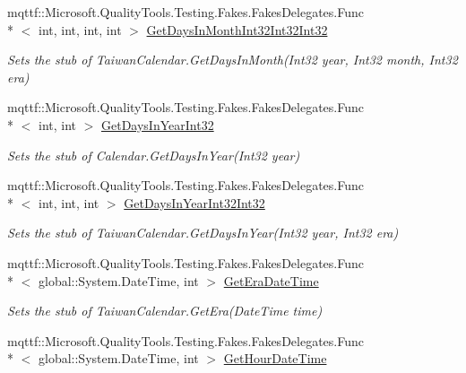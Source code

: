 \begin{DoxyCompactItemize}
mqttf\-::\-Microsoft.\-Quality\-Tools.\-Testing.\-Fakes.\-Fakes\-Delegates.\-Func\\*
$<$ int, int, int, int $>$ \hyperlink{class_system_1_1_globalization_1_1_fakes_1_1_stub_taiwan_calendar_a46320e83e8f0cf475e08401b28fa5ee6}{Get\-Days\-In\-Month\-Int32\-Int32\-Int32}
\begin{DoxyCompactList}\small\item\em Sets the stub of Taiwan\-Calendar.\-Get\-Days\-In\-Month(\-Int32 year, Int32 month, Int32 era)\end{DoxyCompactList}\item 
mqttf\-::\-Microsoft.\-Quality\-Tools.\-Testing.\-Fakes.\-Fakes\-Delegates.\-Func\\*
$<$ int, int $>$ \hyperlink{class_system_1_1_globalization_1_1_fakes_1_1_stub_taiwan_calendar_a580ad21760fc6a2e17c2192261085f43}{Get\-Days\-In\-Year\-Int32}
\begin{DoxyCompactList}\small\item\em Sets the stub of Calendar.\-Get\-Days\-In\-Year(\-Int32 year)\end{DoxyCompactList}\item 
mqttf\-::\-Microsoft.\-Quality\-Tools.\-Testing.\-Fakes.\-Fakes\-Delegates.\-Func\\*
$<$ int, int, int $>$ \hyperlink{class_system_1_1_globalization_1_1_fakes_1_1_stub_taiwan_calendar_a81866b5b3da7eaab3b66d85e1c1dfcf3}{Get\-Days\-In\-Year\-Int32\-Int32}
\begin{DoxyCompactList}\small\item\em Sets the stub of Taiwan\-Calendar.\-Get\-Days\-In\-Year(\-Int32 year, Int32 era)\end{DoxyCompactList}\item 
mqttf\-::\-Microsoft.\-Quality\-Tools.\-Testing.\-Fakes.\-Fakes\-Delegates.\-Func\\*
$<$ global\-::\-System.\-Date\-Time, int $>$ \hyperlink{class_system_1_1_globalization_1_1_fakes_1_1_stub_taiwan_calendar_a7da7716e1e2576844fd0d7904f1596cb}{Get\-Era\-Date\-Time}
\begin{DoxyCompactList}\small\item\em Sets the stub of Taiwan\-Calendar.\-Get\-Era(\-Date\-Time time)\end{DoxyCompactList}\item 
mqttf\-::\-Microsoft.\-Quality\-Tools.\-Testing.\-Fakes.\-Fakes\-Delegates.\-Func\\*
$<$ global\-::\-System.\-Date\-Time, int $>$ \hyperlink{class_system_1_1_globalization_1_1_fakes_1_1_stub_taiwan_calendar_ab31a043db92f41809ea6f2808eb8154a}{Get\-Hour\-Date\-Time}

\end{DoxyCompactItemize}
